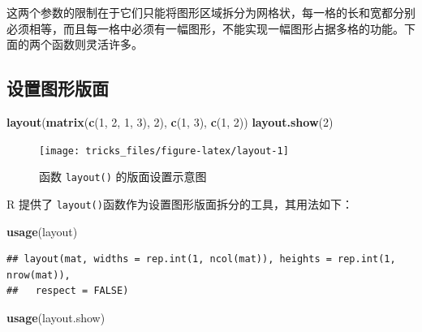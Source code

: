 \documentclass[
  b5paper,
  UTF8,twoside]{book}
\newenvironment{Shaded}{\begin{snugshade}}{\end{snugshade}}
\newcommand{\DecValTok}[1]{\textcolor[rgb]{0.00,0.00,0.81}{#1}}
\newcommand{\FunctionTok}[1]{\textcolor[rgb]{0.13,0.29,0.53}{\textbf{#1}}}
\newcommand{\NormalTok}[1]{#1}
\begin{document}
这两个参数的限制在于它们只能将图形区域拆分为网格状，每一格的长和宽都分别必须相等，而且每一格中必须有一幅图形，不能实现一幅图形占据多格的功能。下面的两个函数则灵活许多。

\subsection{设置图形版面}\label{ux8bbeux7f6eux56feux5f62ux7248ux9762}

\begin{Shaded}
\begin{Highlighting}[]
\FunctionTok{layout}\NormalTok{(}\FunctionTok{matrix}\NormalTok{(}\FunctionTok{c}\NormalTok{(}\DecValTok{1}\NormalTok{, }\DecValTok{2}\NormalTok{, }\DecValTok{1}\NormalTok{, }\DecValTok{3}\NormalTok{), }\DecValTok{2}\NormalTok{), }\FunctionTok{c}\NormalTok{(}\DecValTok{1}\NormalTok{, }\DecValTok{3}\NormalTok{), }\FunctionTok{c}\NormalTok{(}\DecValTok{1}\NormalTok{, }\DecValTok{2}\NormalTok{))}
\FunctionTok{layout.show}\NormalTok{(}\DecValTok{2}\NormalTok{)}
\end{Highlighting}
\end{Shaded}

\begin{figure}

{\centering \texttt{[image: tricks\_files/figure-latex/layout-1]} 

}

\caption{函数 \texttt{layout()} 的版面设置示意图}\label{fig:layout}
\end{figure}



R 提供了 \texttt{layout()}函数作为设置图形版面拆分的工具，其用法如下：

\begin{Shaded}
\begin{Highlighting}[]
\FunctionTok{usage}\NormalTok{(layout)}
\end{Highlighting}
\end{Shaded}

\begin{verbatim}
## layout(mat, widths = rep.int(1, ncol(mat)), heights = rep.int(1, nrow(mat)),
##   respect = FALSE)
\end{verbatim}

\begin{Shaded}
\begin{Highlighting}[]
\FunctionTok{usage}\NormalTok{(layout.show)}
\end{Highlighting}
\end{Shaded}
\end{document}
